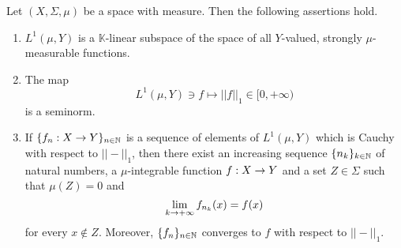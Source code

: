 \begin{theorem}[Riesz]\label{theorem:riesz_theorem}
Let $(X,\Sigma,\mu)$ be a space with measure. Then the following assertions hold.
\begin{enumerate}[label=\emph{\textbf{(\arabic*)}}, leftmargin=*]
\item $L^1(\mu,Y)$ is a $\mathbb{K}$-linear subspace of the space of all $Y$-valued, strongly $\mu$-measurable functions.
\item The map
$$L^1(\mu,Y)\ni f \mapsto ||f||_1\in [0,+\infty)$$
is a seminorm.
\item If $\{f_n:X\rightarrow Y\}_{n\in {\mathbb N}}$ is a sequence of elements of $L^1(\mu,Y)$ which is Cauchy with respect to $||-||_1$, then there exist an increasing sequence $\{n_k\}_{k\in {\mathbb N}}$ of natural numbers, a $\mu$-integrable function $f:X\rightarrow Y$ and a set $Z\in \Sigma$ such that $\mu(Z) = 0$ and
$$\lim_{k\rightarrow +\infty}f_{n_k}(x) = f(x)$$
for every $x \not \in Z$. Moreover, $\{f_n\}_{n\in {\mathbb N}}$ converges to $f$ with respect to $||-||_1$.
\end{enumerate}
\end{theorem}
